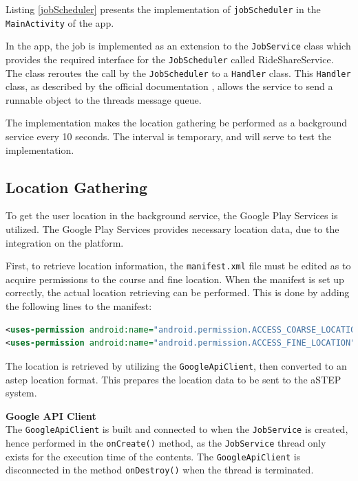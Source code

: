 Listing \ref{jobScheduler} presents the implementation of \texttt{jobScheduler} in the \texttt{MainActivity} of the app.

In the app, the job is implemented as an extension to the \texttt{JobService} class which provides the required interface for the \texttt{JobScheduler} called RideShareService.
The class reroutes the call by the \texttt{JobScheduler} to a \texttt{Handler} class.
This \texttt{Handler} class, as described by the official documentation \cite{handler}, allows the service to send a runnable object to the threads message queue.

The implementation makes the location gathering be performed as a background service every 10 seconds.
The interval is temporary, and will serve to test the implementation.




\subsection{Location Gathering}
To get the user location in the background service, the Google Play Services is utilized.
The Google Play Services provides necessary location data, due to the integration on the platform.

First, to retrieve location information, the \texttt{manifest.xml} file must be edited as to acquire permissions to the course and fine location.
When the manifest is set up correctly, the actual location retrieving can be performed.
This is done by adding the following lines to the manifest:
\begin{lstlisting}[language=XML]
<uses-permission android:name="android.permission.ACCESS_COARSE_LOCATION"/>
<uses-permission android:name="android.permission.ACCESS_FINE_LOCATION"/>
\end{lstlisting}

The location is retrieved by utilizing the \texttt{GoogleApiClient}, then converted to an \gls{astep} location format.
This prepares the location data to be sent to the aSTEP system.


\textbf{Google API Client}\\
The \texttt{GoogleApiClient} is built and connected to when the \texttt{JobService} is created, hence performed in the \texttt{onCreate()} method, as the \texttt{JobService} thread only exists for the execution time of the contents.
The \texttt{GoogleApiClient} is disconnected in the method \texttt{onDestroy()} when the thread is terminated.

